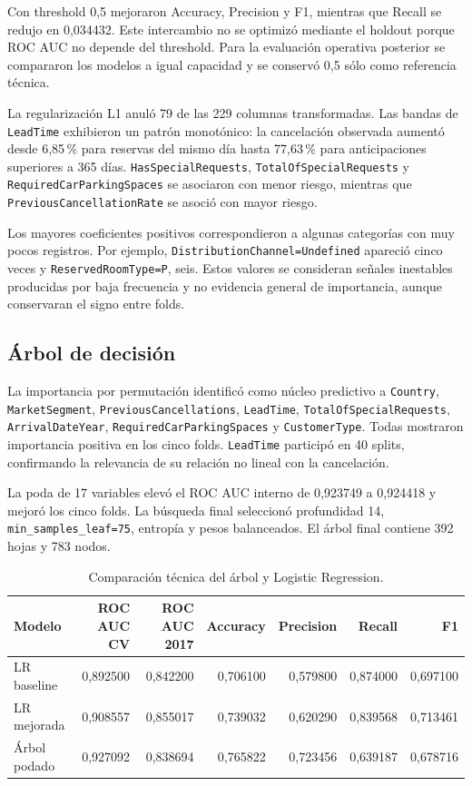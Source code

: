 Con threshold 0,5 mejoraron Accuracy, Precision y F1, mientras que Recall se
redujo en 0,034432. Este intercambio no se optimizó mediante el holdout porque
ROC AUC no depende del threshold. Para la evaluación operativa posterior se
compararon los modelos a igual capacidad y se conservó 0,5 sólo como referencia
técnica.

La regularización L1 anuló 79 de las 229 columnas transformadas. Las bandas de
\texttt{LeadTime} exhibieron un patrón monotónico: la cancelación observada
aumentó desde 6,85\,\% para reservas del mismo día hasta 77,63\,\% para
anticipaciones superiores a 365 días. \texttt{HasSpecialRequests},
\texttt{TotalOfSpecialRequests} y \texttt{RequiredCarParkingSpaces} se
asociaron con menor riesgo, mientras que \texttt{PreviousCancellationRate} se
asoció con mayor riesgo.

Los mayores coeficientes positivos correspondieron a algunas categorías con
muy pocos registros. Por ejemplo, \texttt{DistributionChannel=Undefined}
apareció cinco veces y \texttt{ReservedRoomType=P}, seis. Estos valores se
consideran señales inestables producidas por baja frecuencia y no evidencia
general de importancia, aunque conservaran el signo entre folds.

\subsection{Árbol de decisión}

La importancia por permutación identificó como núcleo predictivo a
\texttt{Country}, \texttt{MarketSegment}, \texttt{PreviousCancellations},
\texttt{LeadTime}, \texttt{TotalOfSpecialRequests},
\texttt{ArrivalDateYear}, \texttt{RequiredCarParkingSpaces} y
\texttt{CustomerType}. Todas mostraron importancia positiva en los cinco
folds. \texttt{LeadTime} participó en 40 splits, confirmando la relevancia de
su relación no lineal con la cancelación.

La poda de 17 variables elevó el ROC AUC interno de 0,923749 a 0,924418 y
mejoró los cinco folds. La búsqueda final seleccionó profundidad 14,
\texttt{min\_samples\_leaf=75}, entropía y pesos balanceados. El árbol final
contiene 392 hojas y 783 nodos.

\begin{table}[htbp]
    \centering
    \caption{Comparación técnica del árbol y Logistic Regression.}
    \label{tab:decision-tree-comparison}
    \begin{tabular}{lrrrrrr}
        \toprule
        Modelo & ROC AUC CV & ROC AUC 2017 & Accuracy & Precision & Recall & F1 \\
        \midrule
        LR baseline & 0,892500 & 0,842200 & 0,706100 & 0,579800 & 0,874000 & 0,697100 \\
        LR mejorada & 0,908557 & 0,855017 & 0,739032 & 0,620290 & 0,839568 & 0,713461 \\
        Árbol podado & 0,927092 & 0,838694 & 0,765822 & 0,723456 & 0,639187 & 0,678716 \\
        \bottomrule
    \end{tabular}
\end{table}

